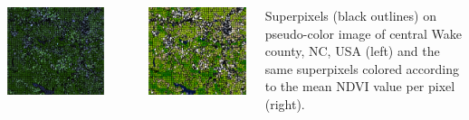 \documentclass[25pt, margin=0mm, innermargin=15mm, blockverticalspace=15mm, colspace=15mm, subcolspace=8mm]{tikzposter}
\begin{document}
\begin{columns}
{\begin{minipage}{0.5\linewidth}
\begin{center}
\includegraphics[width=\textwidth]{superpixels_slic_pseudo}
\end{center}
\end{minipage}
~
\begin{minipage}{0.5\linewidth}
\begin{center}
\includegraphics[width=\textwidth]{superpixels_slic_colored}
\end{center}
\end{minipage}
\vspace{2mm}
\begin{center}
Superpixels (black outlines) on pseudo-color image of central Wake county, NC, USA (left)
and the same superpixels colored according to the mean NDVI value per pixel (right).
\end{center}

}
\end{columns}
\end{document}
